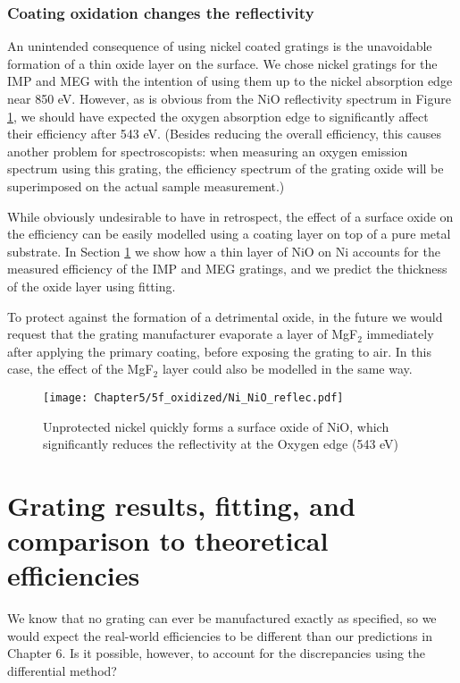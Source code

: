 \subsubsection{Coating oxidation changes the reflectivity}
\label{nickelOxidation}
An unintended consequence of using nickel coated gratings is the unavoidable formation of a thin oxide layer on the surface.  We chose nickel gratings for the IMP and MEG with the intention of using them up to the nickel absorption edge near 850 eV.  However, as is obvious from the NiO reflectivity spectrum in Figure \ref{5f}, we should have expected the oxygen absorption edge to significantly affect their efficiency after 543 eV.  (Besides reducing the overall efficiency, this causes another problem for spectroscopists: when measuring an oxygen emission spectrum using this grating, the efficiency spectrum of the grating oxide will be superimposed on the actual sample measurement.)

While obviously undesirable to have in retrospect, the effect of a surface oxide on the efficiency can be easily modelled using a coating layer on top of a pure metal substrate. In Section \ref{gratingResults} we show how a thin layer of NiO on Ni accounts for the measured efficiency of the IMP and MEG gratings, and we predict the thickness of the oxide layer using fitting.

To protect against the formation of a detrimental oxide, in the future we would request that the grating manufacturer evaporate a layer of MgF$_2$ immediately after applying the primary coating, before exposing the grating to air.  In this case, the effect of the MgF$_2$ layer could also be modelled in the same way.


\begin{figure}[htbp] %
   \centering
   \texttt{[image: Chapter5/5f\_oxidized/Ni\_NiO\_reflec.pdf]} 
   \caption{Unprotected nickel quickly forms a surface oxide of NiO, which significantly reduces the reflectivity at the Oxygen edge (543 eV) }
   \label{5f}
\end{figure}

\section{Grating results, fitting, and comparison to theoretical efficiencies}
\label{gratingResults}
We know that no grating can ever be manufactured exactly as specified, so we would expect the real-world efficiencies to be different than our predictions in Chapter 6.  Is it possible, however, to account for the discrepancies using the differential method?

